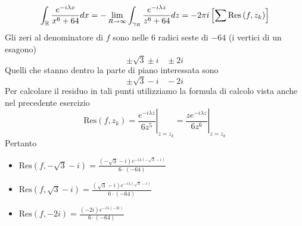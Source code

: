 \begin{equation*}
\int _{\mathbb{R} }\frac{e^{-i\lambda x}}{x^{6} +64} dx=-\lim\limits _{R\rightarrow \infty }\int _{\gamma _{R}}\frac{e^{-i\lambda z}}{z^{6} +64} dz=-2\pi i\left[\sum \mathrm{Res}\left( f,z_{k}\right)\right]
\end{equation*}
Gli zeri al denominatore di $f$ sono nelle $6$ radici seste di $-64$ (i vertici di un esagono)
\begin{equation*}
\pm \sqrt{3} \pm i\ \ \ \ \pm 2i
\end{equation*}
Quelli che stanno dentro la parte di piano interessata sono
\begin{equation*}
\pm \sqrt{3} -i\ \ \ \ -2i
\end{equation*}
Per calcolare il residuo in tali punti utilizziamo la formula di calcolo vista anche nel precedente esercizio
\begin{equation*}
\mathrm{Res}\left( f,z_{k}\right) =\left. \frac{e^{-i\lambda z}}{6z^{5}}\right| _{z=z_{k}} =\left. \frac{ze^{-i\lambda z}}{6z^{6}}\right| _{z=z_{k}}
\end{equation*}
Pertanto
\begin{itemize}
\item $\mathrm{Res}\left( f,-\sqrt{3} -i\right) =\frac{\left( -\sqrt{3} -i\right) e^{-i\lambda \left( -\sqrt{3} -i\right)}}{6\cdotp \left( -64\right)}$
\item $\mathrm{Res}\left( f,\sqrt{3} -i\right) =\frac{\left(\sqrt{3} -i\right) e^{-i\lambda \left(\sqrt{3} -i\right)}}{6\cdotp \left( -64\right)}$
\item $\mathrm{Res}\left( f,-2i\right) =\frac{\left( -2i\right) e^{-i\lambda \left( -2i\right)}}{6\cdotp \left( -64\right)}$
\end{itemize}

